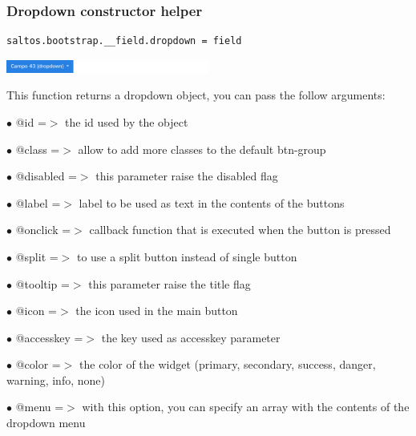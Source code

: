 \documentclass[a4paper]{article}
\begin{document}
\hypertarget{toc92}{}
\subsubsection{Dropdown constructor helper}

\begin{lstlisting}
saltos.bootstrap.__field.dropdown = field
\end{lstlisting}

\begin{center}\includegraphics[width=0.5\textwidth]{../ujest/snaps/test-bootstrap-js-bootstrap-campo-43-dropdown-1-snap.png}\end{center}

This function returns a dropdown object, you can pass the follow arguments:

\begin{compactitem}
\item[\color{myblue}$\bullet$] @id        =$>$ the id used by the object
\item[\color{myblue}$\bullet$] @class     =$>$ allow to add more classes to the default btn-group
\item[\color{myblue}$\bullet$] @disabled  =$>$ this parameter raise the disabled flag
\item[\color{myblue}$\bullet$] @label     =$>$ label to be used as text in the contents of the buttons
\item[\color{myblue}$\bullet$] @onclick   =$>$ callback function that is executed when the button is pressed
\item[\color{myblue}$\bullet$] @split     =$>$ to use a split button instead of single button
\item[\color{myblue}$\bullet$] @tooltip   =$>$ this parameter raise the title flag
\item[\color{myblue}$\bullet$] @icon      =$>$ the icon used in the main button
\item[\color{myblue}$\bullet$] @accesskey =$>$ the key used as accesskey parameter
\item[\color{myblue}$\bullet$] @color     =$>$ the color of the widget (primary, secondary, success, danger, warning, info, none)
\item[\color{myblue}$\bullet$] @menu      =$>$ with this option, you can specify an array with the contents of the dropdown menu
\end{compactitem}
\end{document}
